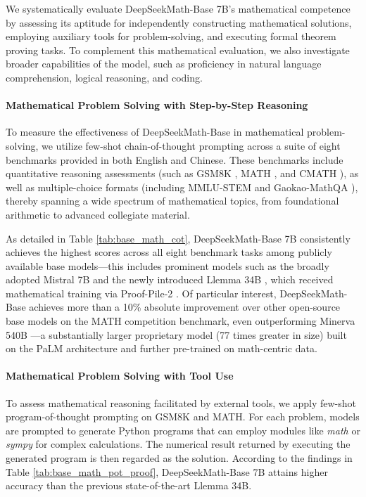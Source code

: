 \begin{itemize}[topsep=0pt]
We systematically evaluate DeepSeekMath-Base 7B's mathematical competence by assessing its aptitude for independently constructing mathematical solutions, employing auxiliary tools for problem-solving, and executing formal theorem proving tasks. To complement this mathematical evaluation, we also investigate broader capabilities of the model, such as proficiency in natural language comprehension, logical reasoning, and coding.

\paragraph{Mathematical Problem Solving with Step-by-Step Reasoning}

To measure the effectiveness of DeepSeekMath-Base in mathematical problem-solving, we utilize few-shot chain-of-thought prompting \citep{cot} across a suite of eight benchmarks provided in both English and Chinese. These benchmarks include quantitative reasoning assessments (such as GSM8K \citep{gsm8k}, MATH \citep{MATH}, and CMATH \citep{wei2023cmath}), as well as multiple-choice formats (including MMLU-STEM \citep{mmlu} and Gaokao-MathQA \citep{agieval}), thereby spanning a wide spectrum of mathematical topics, from foundational arithmetic to advanced collegiate material.

As detailed in Table \ref{tab:base_math_cot}, DeepSeekMath-Base 7B consistently achieves the highest scores across all eight benchmark tasks among publicly available base models—this includes prominent models such as the broadly adopted Mistral 7B \citep{mistral} and the newly introduced Llemma 34B \citep{llemma}, which received mathematical training via Proof-Pile-2 \citep{llemma}. Of particular interest, DeepSeekMath-Base achieves more than a 10\% absolute improvement over other open-source base models on the MATH competition benchmark, even outperforming Minerva 540B \citep{minerva}—a substantially larger proprietary model (77 times greater in size) built on the PaLM architecture \citep{palm} and further pre-trained on math-centric data.

\paragraph{Mathematical Problem Solving with Tool Use} 

To assess mathematical reasoning facilitated by external tools, we apply few-shot program-of-thought prompting \citep{pot,pal} on GSM8K and MATH. For each problem, models are prompted to generate Python programs that can employ modules like \textit{math} or \textit{sympy} for complex calculations. The numerical result returned by executing the generated program is then regarded as the solution. According to the findings in Table \ref{tab:base_math_pot_proof}, DeepSeekMath-Base 7B attains higher accuracy than the previous state-of-the-art Llemma 34B.


\end{itemize}
